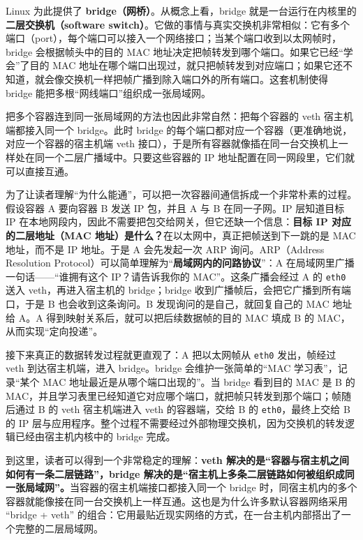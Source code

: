 Linux 为此提供了 \textbf{bridge（网桥）}。从概念上看，bridge 就是一台运行在内核里的\textbf{二层交换机（software switch）}。它做的事情与真实交换机非常相似：它有多个端口（port），每个端口可以接入一个网络接口；当某个端口收到以太网帧时，bridge 会根据帧头中的目的 MAC 地址决定把帧转发到哪个端口。如果它已经“学会”了目的 MAC 地址在哪个端口出现过，就只把帧转发到对应端口；如果它还不知道，就会像交换机一样把帧广播到除入端口外的所有端口。这套机制使得 bridge 能把多根“网线端口”组织成一张局域网。

把多个容器连到同一张局域网的方法也因此非常自然：把每个容器的 veth 宿主机端都接入同一个 bridge。此时 bridge 的每个端口都对应一个容器（更准确地说，对应一个容器的宿主机端 veth 接口），于是所有容器就像插在同一台交换机上一样处在同一个二层广播域中。只要这些容器的 IP 地址配置在同一网段里，它们就可以直接互通。

为了让读者理解“为什么能通”，可以把一次容器间通信拆成一个非常朴素的过程。假设容器 A 要向容器 B 发送 IP 包，并且 A 与 B 在同一子网。IP 层知道目标 IP 在本地网段内，因此不需要把包交给网关，但它还缺一个信息：\textbf{目标 IP 对应的二层地址（MAC 地址）是什么？}在以太网中，真正把帧送到下一跳的是 MAC 地址，而不是 IP 地址。于是 A 会先发起一次 ARP 询问。ARP（Address Resolution Protocol）可以简单理解为“\textbf{局域网内的问路协议}”：A 在局域网里广播一句话——“谁拥有这个 IP？请告诉我你的 MAC”。这条广播会经过 A 的 \texttt{eth0} 送入 veth，再进入宿主机的 bridge；bridge 收到广播帧后，会把它广播到所有端口，于是 B 也会收到这条询问。B 发现询问的是自己，就回复自己的 MAC 地址给 A。A 得到映射关系后，就可以把后续数据帧的目的 MAC 填成 B 的 MAC，从而实现“定向投递”。

接下来真正的数据转发过程就更直观了：A 把以太网帧从 \texttt{eth0} 发出，帧经过 veth 到达宿主机端，进入 bridge。bridge 会维护一张简单的“MAC 学习表”，记录“某个 MAC 地址最近是从哪个端口出现的”。当 bridge 看到目的 MAC 是 B 的 MAC，并且学习表里已经知道它对应哪个端口，就把帧只转发到那个端口；帧随后通过 B 的 veth 宿主机端进入 veth 的容器端，交给 B 的 \texttt{eth0}，最终上交给 B 的 IP 层与应用程序。整个过程不需要经过外部物理交换机，因为交换机的转发逻辑已经由宿主机内核中的 bridge 完成。

到这里，读者可以得到一个非常稳定的理解：\textbf{veth 解决的是“容器与宿主机之间如何有一条二层链路”，bridge 解决的是“宿主机上多条二层链路如何被组织成同一张局域网”。}当容器的宿主机端接口都接入同一个 bridge 时，同宿主机内的多个容器就能像接在同一台交换机上一样互通。这也是为什么许多默认容器网络采用 “bridge + veth” 的组合：它用最贴近现实网络的方式，在一台主机内部搭出了一个完整的二层局域网。


